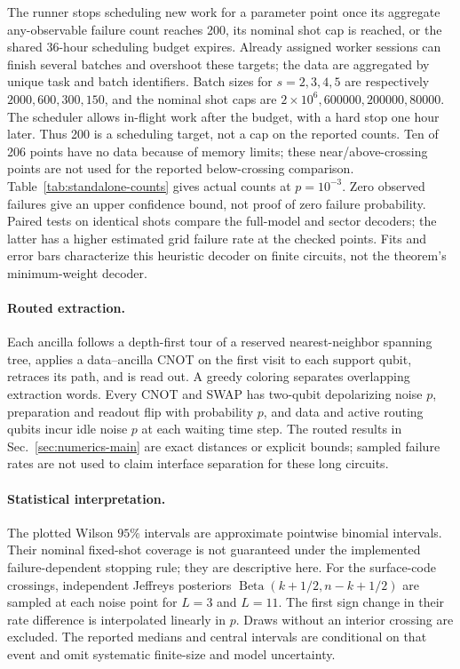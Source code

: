 The runner stops scheduling new work for a parameter point once its
aggregate any-observable failure count reaches 200, its nominal shot cap
is reached, or the shared 36-hour scheduling budget expires. Already
assigned worker sessions can finish several batches and overshoot these
targets; the data are aggregated by unique task and batch identifiers.
Batch sizes for $s=2,3,4,5$ are respectively $2000,600,300,150$, and the
nominal shot caps are $2\times10^6,600000,200000,80000$. The scheduler
allows in-flight work after the budget, with a hard stop one hour later.
Thus 200 is a scheduling target, not a cap on the reported counts. Ten of 206 points have no data because
of memory limits; these near/above-crossing points are not used for the
reported below-crossing comparison. Table~\ref{tab:standalone-counts}
gives actual counts at $p=10^{-3}$. Zero observed failures give an upper confidence bound, not proof of
zero failure probability. Paired tests on identical shots compare
the full-model and sector decoders; the latter has a higher estimated grid failure rate at the checked points. Fits and error bars characterize this heuristic
decoder on finite circuits, not the theorem's minimum-weight decoder.

\paragraph{Routed extraction.}
Each ancilla follows a depth-first tour of a reserved nearest-neighbor
spanning tree, applies a data--ancilla CNOT on the first visit to each
support qubit, retraces its path, and is read out. A greedy coloring
separates overlapping extraction words. Every CNOT and SWAP has two-qubit
depolarizing noise $p$, preparation and readout flip with probability $p$,
and data and active routing qubits incur idle noise $p$ at each waiting
time step. The routed results in Sec.~\ref{sec:numerics-main} are exact
distances or explicit bounds; sampled failure rates are not used to claim
interface separation for these long circuits.

\paragraph{Statistical interpretation.}
The plotted Wilson $95\%$ intervals are approximate pointwise binomial
intervals. Their nominal fixed-shot coverage is not guaranteed under the
implemented failure-dependent stopping rule; they are descriptive here.
For the surface-code crossings, independent Jeffreys posteriors
$\operatorname{Beta}(k+1/2,n-k+1/2)$ are sampled at each noise point for
$L=3$ and $L=11$. The first sign change in their rate difference is
interpolated linearly in $p$. Draws without an interior crossing are
excluded. The reported medians and central intervals are conditional on
that event and omit systematic finite-size and model uncertainty.

